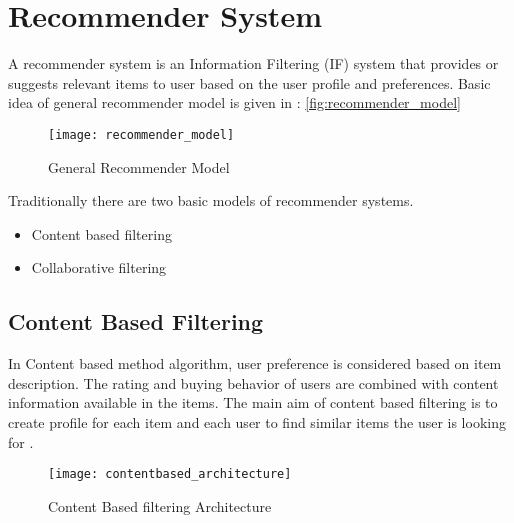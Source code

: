 \section{Recommender System}
A recommender system is an Information Filtering (IF) system that provides or suggests relevant items to user based on the user profile and preferences. Basic idea of general recommender model is given in : \autoref{fig:recommender_model} \\

\begin{figure}[H]
	\centering
	\texttt{[image: recommender\_model]}
	\caption{General Recommender Model \cite{3}}
	\label{fig:recommender_model}
\end{figure}

\noindent Traditionally there are two basic models of recommender systems. \begin{itemize} \item Content based filtering \item Collaborative filtering \end{itemize}


\pagebreak

\subsection{Content Based Filtering}
In Content based method algorithm, user preference is considered based on item description. The rating and buying behavior of users are combined with content information available in the items. The main aim of content based filtering is to create profile for each item and each user to find similar items the user is looking for \cite{6}.
\\

\begin{figure}[H]
	\centering
	\texttt{[image: contentbased\_architecture]}
	\caption{Content Based filtering Architecture \cite{5}}
	\label{fig:contentbased_architecture}
\end{figure}

